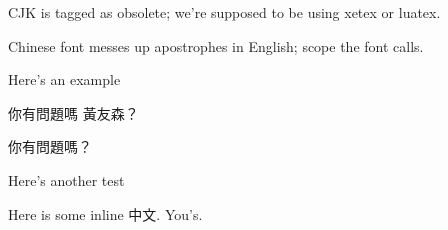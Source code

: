 \documentclass{article}
\begin{document}
CJK is tagged as obsolete; we're supposed to be using xetex or luatex.

Chinese font messes up apostrophes in English; scope the font calls.

{ \setmainfont{Noto Serif CJK TC}
\setsansfont{Noto Sans CJK TC}
Here's an example


你有問題嗎 黃友森？

\sffamily
你有問題嗎？
}

Here's another test

Here is some inline 
{ \setmainfont{Noto Serif CJK TC} 中文}. You's.
\end{document}
